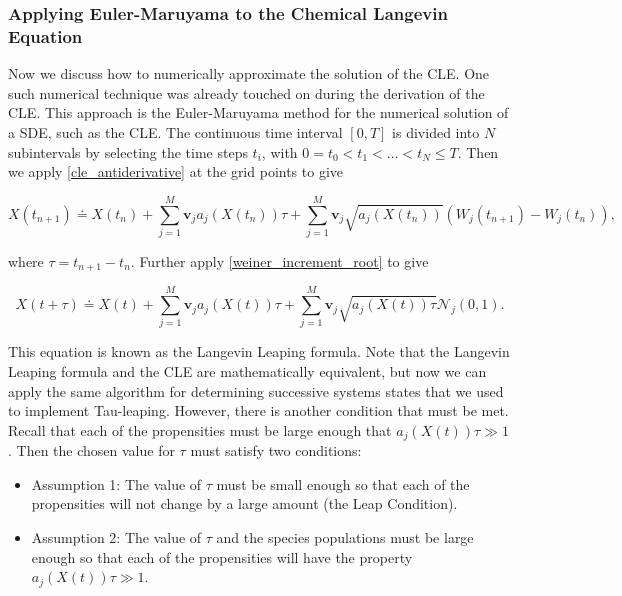 \documentclass[ugrad,lot,lof,openright,11pt,oneside,onehalfspace]{RUthesis}
\begin{document}
			\subsubsection{Applying Euler-Maruyama to the Chemical Langevin Equation}

				Now we discuss how to numerically approximate the solution of the CLE. One such numerical technique was already touched on during the derivation of the CLE. This approach is the Euler-Maruyama method for the numerical solution of a SDE, such as the CLE. The continuous time interval $[0,T]$ is divided into $N$ subintervals by selecting the time steps $t_i$, with $0=t_0 < t_1 < \ldots < t_N \leq T$. Then we apply \eqref{cle_antiderivative} at the grid points to give

				\begin{equation*}
				X(t_{n+1}) \doteq X(t_n) + \sum\limits_{j=1}^{M} \mathbf{v}_j a_j(X(t_n))\tau + \sum\limits_{j=1}^{M} \mathbf{v}_j \sqrt{a_j(X(t_n))} ( W_j(t_{n+1})-W_j(t_n) ),
				\end{equation*}

				\noindent
				where $\tau = t_{n+1}-t_n$. Further apply \eqref{weiner_increment_root} to give

				\begin{equation}\label{langevin_leaping_formula}
				X(t+\tau) \doteq X(t) + \sum\limits_{j=1}^{M} \mathbf{v}_j a_j(X(t))\tau + \sum\limits_{j=1}^{M} \mathbf{v}_j \sqrt{a_j(X(t))\tau} \mathcal{N}_j(0,1).
				\end{equation}

				\noindent
				This equation is known as the Langevin Leaping formula. Note that the Langevin Leaping formula and the CLE are mathematically equivalent, but now we can apply the same algorithm for determining successive systems states that we used to implement Tau-leaping. However, there is another condition that must be met. Recall that each of the propensities must be large enough that $a_j(X(t))\tau \gg 1$. Then the chosen value for $\tau$ must satisfy two conditions:

				\begin{itemize}
					\item Assumption 1: The value of $\tau$ must be small enough so that each of the propensities will not change by a large amount (the Leap Condition).
					\item Assumption 2: The value of $\tau$ and the species populations must be large enough so that each of the propensities will have the property $a_j(X(t))\tau \gg 1.$
				\end{itemize}
\end{document}

